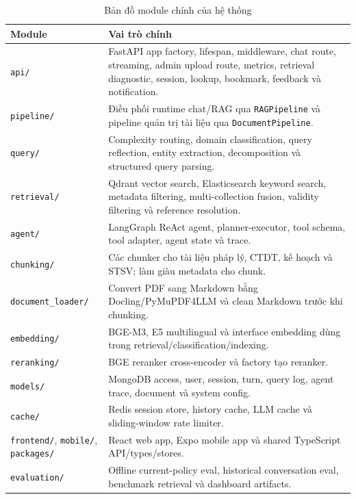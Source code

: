 \documentclass[../DoAn.tex]{subfiles}
\begin{document}
\begin{table}[h]
\centering
\begin{tabular}{|l|p{10.2cm}|}
\hline
\textbf{Module} & \textbf{Vai trò chính} \\
\hline
\texttt{api/} & FastAPI app factory, lifespan, middleware, chat route, streaming,
admin upload route, metrics, retrieval diagnostic, session, lookup, bookmark,
feedback và notification. \\
\hline
\texttt{pipeline/} & Điều phối runtime chat/RAG qua \texttt{RAGPipeline} và pipeline
quản trị tài liệu qua \texttt{DocumentPipeline}. \\
\hline
\texttt{query/} & Complexity routing, domain classification, query reflection,
entity extraction, decomposition và structured query parsing. \\
\hline
\texttt{retrieval/} & Qdrant vector search, Elasticsearch keyword search, metadata
filtering, multi-collection fusion, validity filtering và reference resolution. \\
\hline
\texttt{agent/} & LangGraph ReAct agent, planner-executor, tool schema, tool
adapter, agent state và trace. \\
\hline
\texttt{chunking/} & Các chunker cho tài liệu pháp lý, CTDT, kế hoạch và STSV; làm
giàu metadata cho chunk. \\
\hline
\texttt{document\_loader/} & Convert PDF sang Markdown bằng Docling/PyMuPDF4LLM và
clean Markdown trước khi chunking. \\
\hline
\texttt{embedding/} & BGE-M3, E5 multilingual và interface embedding dùng trong
retrieval/classification/indexing. \\
\hline
\texttt{reranking/} & BGE reranker cross-encoder và factory tạo reranker. \\
\hline
\texttt{models/} & MongoDB access, user, session, turn, query log, agent trace,
document và system config. \\
\hline
\texttt{cache/} & Redis session store, history cache, LLM cache và sliding-window
rate limiter. \\
\hline
\texttt{frontend/}, \texttt{mobile/}, \texttt{packages/} & React web app, Expo
mobile app và shared TypeScript API/types/stores. \\
\hline
\texttt{evaluation/} & Offline current-policy eval, historical conversation eval,
benchmark retrieval và dashboard artifacts. \\
\hline
\end{tabular}
\caption{Bản đồ module chính của hệ thống}
\end{table}
\end{document}
